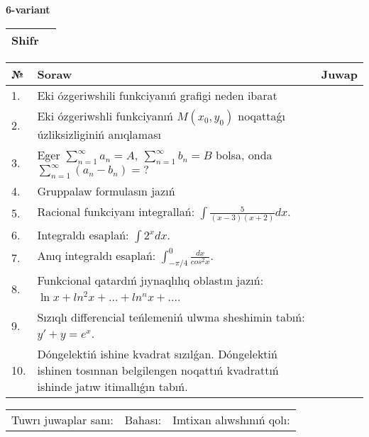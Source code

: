 \documentclass{article}
\begin{document}
  \egroup
  
  \newpage
  
  
  \textbf{6-variant}\\
  
  \bgroup
  \def\arraystretch{1.6} %
  
  \begin{tabular}{|m{5.7cm}|m{9.5cm}|}
  \hline
  Shifr & \\
  \hline
  \end{tabular}
  
  \vspace{1cm}
  
  \begin{tabular}{|m{0.7cm}|m{10cm}|m{4cm}|}
  \hline
  № & Soraw & Juwap \\
  \hline
  1. & Eki ózgeriwshili funkciyanıń grafigi neden ibarat &  \\
  \hline
  2. & Eki ózgeriwshli funkciyanıń \(M(x_{0}, y_{0})\) noqattaǵı úzliksizliginiń anıqlaması &  \\
  \hline
  3. & Eger \(\sum_{n = 1}^{\infty}a_{n} = A,\ \sum_{n = 1}^{\infty}b_{n} = B\) bolsa, onda \(\sum_{n = 1}^{\infty}\left( a_{n} - b_{n} \right) = ?\) &  \\
  \hline
  4. & Gruppalaw formulasın jazıń &  \\
  \hline
  5. & Racional funkciyanı integrallań: \(\int{\frac{5}{(x - 3)(x + 2)}dx}\). &  \\
  \hline
  6. & Integraldı esaplań: \(\int{2^{x}dx}\). &  \\
  \hline
  7. & Anıq integraldı esaplań: \(\int_{- \pi/4}^{0}\frac{dx}{cos^2 x}\). &  \\
  \hline
  8. & Funkcional qatardıń jıynaqlılıq oblastın jazıń: \(\ln x + ln^2 x + ... + ln^{n}x + ...\). &  \\
  \hline
  9. & Sızıqlı differencial teńlemeniń ulwma sheshimin tabıń: \(y' + y = e^{x}\). &  \\
  \hline
  10. & Dóngelektiń ishine kvadrat sızılǵan. Dóngelektiń ishinen tosınnan belgilengen noqattıń kvadrattıń ishinde jatıw itimallıǵın tabıń. &  \\
  \hline
  \end{tabular}
  
  \vspace{1cm}
  
  \begin{tabular}{lll}
  Tuwrı juwaplar sanı: \underline{\hspace{1.5cm}} & 
  Bahası: \underline{\hspace{1.5cm}} & 
  Imtixan alıwshınıń qolı: \underline{\hspace{2cm}} \\
  \end{tabular}
  
\end{document}
